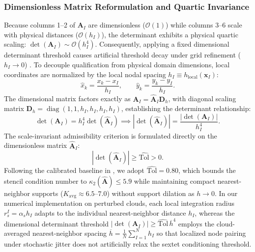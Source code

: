 \documentclass[VANCOUVER,Times1COL]{WileyNJD-v5}
\begin{document}
\subsubsection{Dimensionless Matrix Reformulation and Quartic Invariance}
Because columns 1--2 of $\mathbf{A}_I$ are dimensionless ($\mathcal{O}(1)$) while columns 3--6 scale with physical distances ($\mathcal{O}(h_I)$), the determinant exhibits a physical quartic scaling: $\det(\mathbf{A}_I) \sim \mathcal{O}(h_I^4)$. Consequently, applying a fixed dimensional determinant threshold causes artificial threshold decay under grid refinement ($h_I \to 0$) \cite{stable_vnmm2d_2026}.
To decouple qualification from physical domain dimensions, local coordinates are normalized by the local nodal spacing $h_I \equiv h_{\mathrm{local}}(\mathbf{x}_I)$:
\begin{equation}
    \hat{x}_k = \frac{x_k - x_I}{h_I}, \qquad \hat{y}_k = \frac{y_k - y_I}{h_I}.
\end{equation}
The dimensional matrix factors exactly as $\mathbf{A}_I = \widehat{\mathbf{A}}_I \mathbf{D}_h$, with diagonal scaling matrix $\mathbf{D}_h = \operatorname{diag}(1, 1, h_I, h_I, h_I, h_I)$, establishing the determinant relationship:
\begin{equation}
    \det(\mathbf{A}_I) = h_I^4 \det(\widehat{\mathbf{A}}_I) \implies |\det(\widehat{\mathbf{A}}_I)| = \frac{|\det(\mathbf{A}_I)|}{h_I^4}.
    \label{eq:dimensionless_det_relation}
\end{equation}
The scale-invariant admissibility criterion is formulated directly on the dimensionless matrix $\widehat{\mathbf{A}}_I$:
\begin{equation}
    |\det(\widehat{\mathbf{A}}_I)| \ge \widehat{\mathrm{Tol}} > 0.
    \label{eq:scale_invariant_det_criterion}
\end{equation}
Following the calibrated baseline in \cite{stable_vnmm2d_2026}, we adopt $\widehat{\mathrm{Tol}} = 0.80$, which bounds the stencil condition number to $\kappa_2(\widehat{\mathbf{A}}) \le 5.9$ while maintaining compact nearest-neighbor supports ($K_{\mathrm{avg}} \approx 6.5\text{--}7.0$) without support dilation as $h \to 0$. In our numerical implementation on perturbed clouds, each local integration radius $r_s^I = \alpha_s h_I$ adapts to the individual nearest-neighbor distance $h_I$, whereas the dimensional determinant threshold $|\det(\mathbf{A}_I)| \ge \widehat{\mathrm{Tol}} \, \overline{h}^4$ employs the cloud-averaged nearest-neighbor spacing $\overline{h} = \frac{1}{N}\sum_{I=1}^N h_I$ so that localized node pairing under stochastic jitter does not artificially relax the sextet conditioning threshold.
\end{document}
